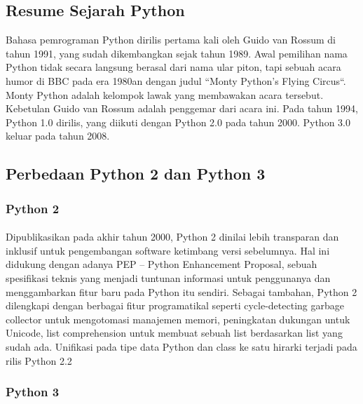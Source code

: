 \subsection{Resume Sejarah Python}
\begin{flushleft}
\qquad Bahasa pemrograman Python dirilis pertama kali oleh Guido van Rossum di tahun 1991, yang sudah dikembangkan sejak tahun 1989. Awal pemilihan nama Python tidak secara langsung berasal dari nama ular piton, tapi sebuah acara humor di BBC pada era 1980an dengan judul “Monty Python’s Flying Circus“. Monty Python adalah kelompok lawak yang membawakan acara tersebut. Kebetulan Guido van Rossum adalah penggemar dari acara ini. Pada tahun 1994, Python 1.0 dirilis, yang diikuti dengan Python 2.0 pada tahun 2000. Python 3.0 keluar pada tahun 2008.
\end{flushleft}
\subsection{Perbedaan Python 2 dan Python 3}
\subsubsection{Python 2}
\paragraph{}
Dipublikasikan pada akhir tahun 2000, Python 2 dinilai lebih transparan dan inklusif untuk pengembangan software ketimbang versi sebelumnya. Hal ini didukung dengan adanya PEP – Python Enhancement Proposal, sebuah spesifikasi teknis yang menjadi tuntunan informasi untuk penggunanya dan menggambarkan fitur baru pada Python itu sendiri. Sebagai tambahan, Python 2 dilengkapi dengan berbagai fitur programatikal seperti cycle-detecting garbage collector untuk mengotomasi manajemen memori, peningkatan dukungan untuk Unicode, list comprehension untuk membuat sebuah list berdasarkan list yang sudah ada. Unifikasi pada tipe data Python dan class ke satu hirarki terjadi pada rilis Python 2.2
\subsubsection{Python 3}
